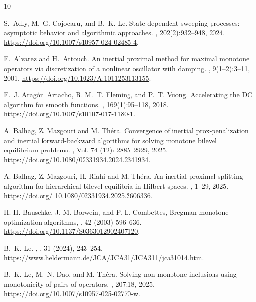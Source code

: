 \documentclass[11pt]{article}
\theoremstyle{definition}
\theoremstyle{definition}
\theoremstyle{definition}
\begin{document}
\begin{thebibliography}{10}


S.~Adly, M.~G. Cojocaru, and B.~K. Le.
\newblock State-dependent sweeping processes: asymptotic behavior and algorithmic approaches.
, 202(2):932--948, 2024.
\newblock \url{https://doi.org/10.1007/s10957-024-02485-4}.

F.~Alvarez and H.~Attouch. 
\newblock An inertial proximal method for maximal monotone operators via discretization of a nonlinear oscillator with damping. 
, 9(1--2):3--11, 2001.
\newblock \url{https://doi.org/10.1023/A:1011253113155}.

F.~J. Arag\'on~Artacho, R. M.~T. Fleming, and P.~T. Vuong.
\newblock Accelerating the {DC} algorithm for smooth functions.
, 169(1):95--118, 2018.
\newblock \url{https://doi.org/10.1007/s10107-017-1180-1}.

{ A. Balhag, Z. Mazgouri and M. Théra.
\newblock Convergence of inertial prox-penalization and inertial forward-backward algorithms for solving monotone bilevel equilibrium problems. 
, Vol. 74 (12): 2885--2929, 2025.
\newblock \url{https://doi.org/10.1080/02331934.2024.2341934}.}

{ A. Balhag, Z. Mazgouri, H. Riahi and M. Théra.
\newblock An inertial proximal splitting algorithm for
hierarchical bilevel equilibria in Hilbert spaces.
,  1--29, 2025.
\newblock \url{https://doi.org/
10.1080/02331934.2025.2606336}.}

H. H. Bauschke, J. M. Borwein, and P. L. Combettes, 
\newblock Bregman monotone optimization algorithms,
, 42 (2003) 596--636.
\newblock \url{https://doi.org/10.1137/S0363012902407120}.

B.~K. Le.
,
, {31} (2024), 243--254.
\newblock \url{https://www.heldermann.de/JCA/JCA31/JCA311/jca31014.htm}.

B.~K. Le, M.~N. Dao, and M. Th\'era. 
\newblock Solving non-monotone inclusions using monotonicity of pairs of operators. 
, 207:18, 2025. 
\newblock \url{https://doi.org/10.1007/s10957-025-02770-w}.


\end{thebibliography}
\end{document}
